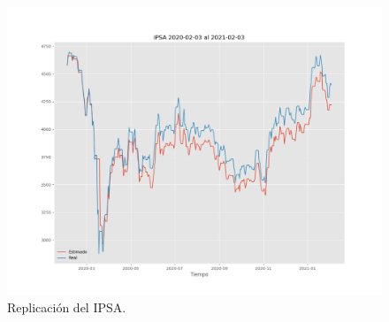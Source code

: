 \documentclass{article}
\begin{document}
	\begin{figure}[H]
		\centering
		\includegraphics[scale=.35]{imgs/ipsa_replication.png}
		\caption{Replicación del IPSA.}
		\label{fig:ipsa_replication}
	\end{figure}





















\newpage

%
\end{document}
